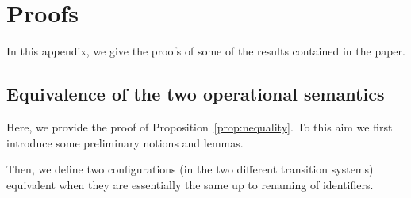\documentclass{tlp}
\begin{document}

















































\newpage

\appendix

 \section{Proofs}


In this appendix, we give the proofs of some of the results contained in the paper.

\subsection{Equivalence of the two operational semantics}

Here, we provide the proof of  Proposition~\ref{prop:nequality}.
To this aim we first introduce some preliminary notions and lemmas.


Then, we define two configurations (in the two different transition systems)
equivalent when they are essentially the same up to renaming of identifiers.
\end{document}
